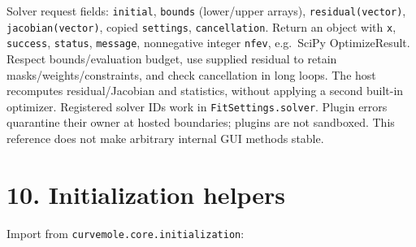 \documentclass[
  10pt,
  a4paper,
  oneside]{scrreprt}
\begin{document}
Solver request fields: \texttt{initial}, \texttt{bounds} (lower/upper
arrays), \texttt{residual(vector)}, \texttt{jacobian(vector)}, copied
\texttt{settings}, \texttt{cancellation}. Return an object with
\texttt{x}, \texttt{success}, \texttt{status}, \texttt{message},
nonnegative integer \texttt{nfev}, e.g.~SciPy OptimizeResult. Respect
bounds/evaluation budget, use supplied residual to retain
masks/weights/constraints, and check cancellation in long loops. The
host recomputes residual/Jacobian and statistics, without applying a
second built-in optimizer. Registered solver IDs work in
\texttt{FitSettings.solver}. Plugin errors quarantine their owner at
hosted boundaries; plugins are not sandboxed. This reference does not
make arbitrary internal GUI methods stable.

\hypertarget{initialization-helpers}{%
\section{10. Initialization helpers}\label{initialization-helpers}}

Import from \texttt{curvemole.core.initialization}:
\end{document}
